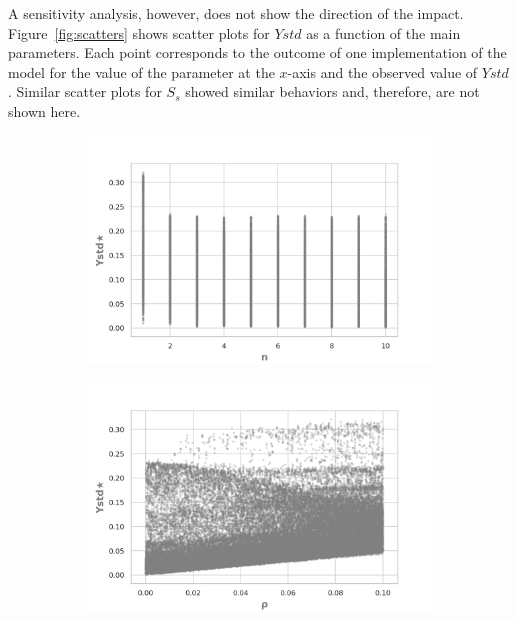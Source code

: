 \documentclass{article}
\begin{document}
         
    A sensitivity analysis, however, does not show the direction of the impact.
    Figure~\ref{fig:scatters} shows scatter plots for $Ystd$ as a function of
    the main parameters. Each point corresponds to the outcome of one
    implementation of the model for the value of the parameter at the $x$-axis
    and the observed value of $Ystd$. Similar scatter plots for $S_s$ showed
    similar behaviors and, therefore, are not shown here.

        \begin{figure}[H]
  \centering
  
    \begin{subfigure}[b]{0.48\textwidth}
      \includegraphics[width=\textwidth]{img/regressionYstd*n.png}
    \end{subfigure}
    \begin{subfigure}[b]{0.48\textwidth}
      \includegraphics[width=\textwidth]{img/regressionYstd*rho.png}

\end{subfigure}
\end{figure}
\end{document}
